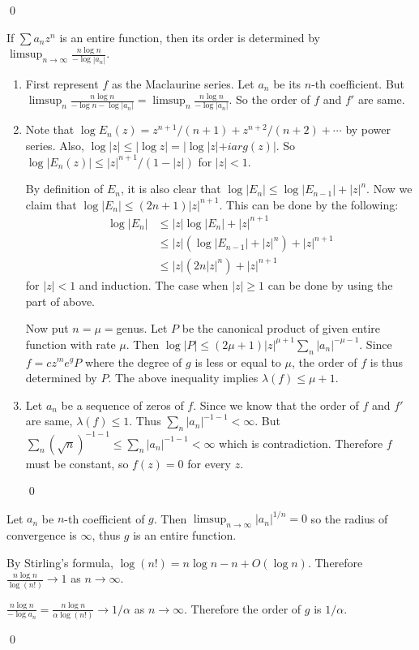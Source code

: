 \qed

\begin{problem}[9.3] \hfill

	If $\sum a_n z^n$ is an entire function, then its order is determined by $\limsup_{n\rightarrow \infty} \frac{n \log n}{-\log |a_n|}$.
	\begin{enumerate}[label = (\alph*)]
		\item First represent $f$ as the Maclaurine series.
			Let $a_n$ be its $n$-th coefficient. 
			But $\limsup_n \frac{n\log n}{-\log n -\log |a_n|} = \limsup_n \frac{n \log n}{- \log |a_n|}$.
			So the order of $f$ and $f'$ are same.
		\item Note that $\log E_n(z) = z^{n+1}/(n+1) + z^{n+2}/(n+2) + \cdots$ by power series.
			Also, $\log|z| \leq |\log z| = |\log |z| + i arg(z)|$.
			So $\log |E_n(z)| \leq |z|^{n+1}/(1-|z|)$ for $|z| < 1$.

			By definition of $E_n$, it is also clear that $\log |E_n| \leq \log |E_{n-1}| + |z|^n$.
			Now we claim that $\log |E_n| \leq (2n+1) |z|^{n+1}$.
			This can be done by the following:
			\[
				\begin{split}
					\log |E_n|
					& \leq |z|\log|E_n| + |z|^{n+1} \\
					& \leq |z|(\log|E_{n-1}| + |z|^n) + |z|^{n+1}\\
					& \leq |z|(2n |z|^n) + |z|^{n+1}
				\end{split}
			\]
			for $|z| < 1$ and induction.
			The case when $|z| \geq 1$ can be done by using the part of above.

			Now put $n = \mu = $genus.
			Let $P$ be the canonical product of given entire function with rate $\mu$.
			Then $\log |P| \leq (2\mu + 1) |z|^{\mu + 1} \sum_n |a_n|^{-\mu -1}$.
			Since $f = c z^m e^g P$ where the degree of $g$ is less or equal to $\mu$,
			the order of $f$ is thus determined by $P$.
			The above inequality implies $\lambda(f) \leq \mu+1$.

		\item Let $a_n$ be a sequence of zeros of $f$. Since we know that the order of $f$ and $f'$ are same, $\lambda(f) \leq 1$.
		Thus $\sum_n |a_n|^{-1 -1} < \infty$. But $\sum_n (\sqrt{n})^{-1 -1} \leq \sum_n |a_n|^{-1 -1} < \infty$ which is contradiction.
			Therefore $f$ must be constant, so $f(z) = 0$ for every $z$.

			\qed
	\end{enumerate}
\end{problem}

\begin{problem}[9.4] \hfill

	Let $a_n$ be $n$-th coefficient of $g$. Then $\limsup_{n\rightarrow \infty} |a_n|^{1/n} = 0$ so the radius of convergence is $\infty$, thus $g$ is an entire function.

	By Stirling's formula, $\log (n!) = n \log n -n + O(\log n)$. Therefore $\frac{n\log n}{\log (n!)} \rightarrow 1 $ as $n \rightarrow \infty$.	

	$\frac{n\log n}{-\log a_n} = \frac{n \log n }{\alpha \log(n!)} \rightarrow 1/\alpha$ as $n\rightarrow \infty$. Therefore the order of $g$ is $1/\alpha$.

	\qed
\end{problem}

